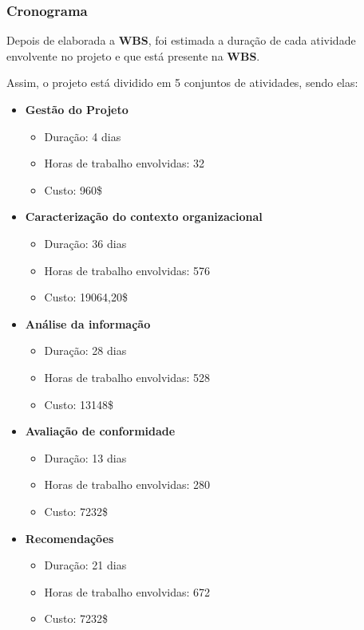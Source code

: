 \subsubsection{Cronograma}

Depois de elaborada a \textbf{WBS}, foi estimada a duração de cada atividade envolvente no projeto e que está presente na \textbf{WBS}.

Assim, o projeto está dividido em 5 conjuntos de atividades, sendo elas:

\begin{itemize}
	\item \textbf{Gestão do Projeto}
		\begin{itemize}
			\item Duração: 4 dias
			\item Horas de trabalho envolvidas: 32
			\item Custo: 960\$
		\end{itemize}
	\item \textbf{Caracterização do contexto organizacional}
		\begin{itemize}
			\item Duração: 36 dias
			\item Horas de trabalho envolvidas: 576
			\item Custo: 19064,20\$
		\end{itemize}
	\item \textbf{Análise da informação}
		\begin{itemize}
			\item Duração: 28 dias
			\item Horas de trabalho envolvidas: 528
			\item Custo: 13148\$
		\end{itemize}
	\item \textbf{Avaliação de conformidade}
		\begin{itemize}
			\item Duração: 13 dias
			\item Horas de trabalho envolvidas: 280
			\item Custo: 7232\$
    \end{itemize}
    \item \textbf{Recomendações}
		\begin{itemize}
      \item Duração: 21 dias
      \item Horas de trabalho envolvidas: 672
			\item Custo: 7232\$
		\end{itemize}
\end{itemize}
